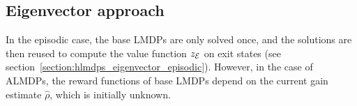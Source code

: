 \subsection{Eigenvector approach}

In the episodic case, the base LMDPs are only solved once, and the solutions are then reused to compute the value function $z_{\mathcal{E}}$ on exit states (see section~\ref{section:hlmdps_eigenvector_episodic}). However, in the case of ALMDPs, the reward functions of base LMDPs depend on the current gain estimate $\hat\rho$, which is initially unknown. 



